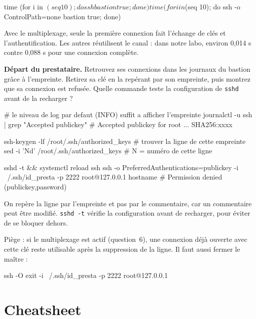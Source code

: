 \documentclass[a4paper,10pt]{exam}
\begin{document}
\begin{questions}
\begin{solution}
\begin{bashcode}
time (for i in $(seq 10); do ssh bastion true; done)
time (for i in $(seq 10); do ssh -o ControlPath=none bastion true; done)
\end{bashcode}
Avec le multiplexage, seule la première connexion fait l'échange de clés et
l'authentification. Les autres réutilisent le canal : dans notre labo, environ 0,014 s
contre 0,088 s pour une connexion complète.
\end{solution}
\question \textbf{Départ du prestataire.} Retrouvez ses connexions dans les journaux du
bastion grâce à l'empreinte. Retirez sa clé en la repérant par son empreinte, puis montrez
que sa connexion est refusée. Quelle commande teste la configuration de \texttt{sshd} avant
de la recharger ?
\begin{solution}
\begin{bashcode}
# le niveau de log par defaut (INFO) suffit a afficher l'empreinte
journalctl -u ssh | grep "Accepted publickey"
# Accepted publickey for root ... SHA256:xxxx

ssh-keygen -lf /root/.ssh/authorized_keys   # trouver la ligne de cette empreinte
sed -i 'Nd' /root/.ssh/authorized_keys      # N = numéro de cette ligne

sshd -t && systemctl reload ssh
ssh -o PreferredAuthentications=publickey -i ~/.ssh/id_presta -p 2222 root@127.0.0.1 hostname
# Permission denied (publickey,password)
\end{bashcode}
On repère la ligne par l'empreinte et pas par le commentaire, car un commentaire peut être
modifié. \texttt{sshd -t} vérifie la configuration avant de recharger, pour éviter de se
bloquer dehors.

Piège : si le multiplexage est actif (question~6), une connexion déjà ouverte avec cette clé
reste utilisable après la suppression de la ligne. Il faut aussi fermer le maître :
\begin{bashcode}
ssh -O exit -i ~/.ssh/id_presta -p 2222 root@127.0.0.1
\end{bashcode}
\end{solution}
\end{questions}

\section{Cheatsheet}
\end{document}
